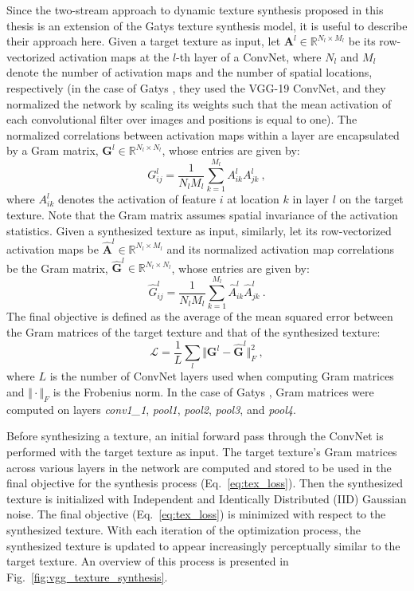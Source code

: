 Since the two-stream approach to dynamic texture synthesis proposed in this thesis is an extension of the Gatys \etal \cite{gatys2015} texture 
synthesis model, it is useful to describe their approach here. Given a target texture as input,
let $\mathbf{A}^{l} \in \mathbb{R}^{N_l\times M_l}$
be its row-vectorized activation maps at the $l$-th layer of a ConvNet, where $N_l$ and $M_l$ denote the number of
activation maps and the number of spatial locations,
respectively (in the case of Gatys \etal \cite{gatys2015}, they used the VGG-19 ConvNet, and they normalized the network by scaling its weights such that the mean activation of each convolutional filter over images and positions is equal to one).
The normalized correlations between activation maps
within a layer are encapsulated by a Gram matrix,
$\mathbf{G}^l \in \mathbb{R}^{N_l \times N_l}$, whose entries are given by:
\begin{equation}
	G_{ij}^l = \frac{1}{N_l M_l} \sum_{k=1}^{M_l} A_{ik}^l A_{jk}^l\ ,
\end{equation}
where $A_{ik}^l$ denotes the activation of feature $i$ at
location $k$ in layer $l$ on the target texture. Note that the Gram matrix assumes spatial invariance of the activation statistics.
Given a synthesized texture as input, similarly, let its row-vectorized activation maps
be $\hat{\mathbf{A}}^{l} \in \mathbb{R}^{N_l\times M_l}$ and its normalized
activation map correlations be the Gram matrix, $\hat{\mathbf{G}}^l \in \mathbb{R}^{N_l \times N_l}$, whose entries are given by:
\begin{equation}
	\hat{G}_{ij}^l = \frac{1}{N_l M_l} \sum_{k=1}^{M_l} \hat{A}_{ik}^l \hat{A}_{jk}^l\ .
\end{equation}
The final objective is defined as the average of the mean squared error between
the Gram matrices of the target texture and that of the synthesized texture:
\begin{equation}
   \mathcal{L} = \frac{1}{L} \sum_{l} \Vert \mathbf{G}^l - \hat{\mathbf{G}}^l \Vert^2_F\ ,
   \label{eq:tex_loss}
\end{equation}
where $L$ is the number of ConvNet layers used when computing Gram matrices
and $\Vert \cdot \Vert_F$ is the Frobenius norm. In the case of Gatys \etal \cite{gatys2015}, Gram matrices were computed on
layers \emph{conv1\_1}, \emph{pool1}, \emph{pool2}, \emph{pool3}, and \emph{pool4}.

Before synthesizing a texture, an initial forward pass through the ConvNet is
performed with the target texture as input. The target texture's Gram matrices
across various layers in the network are computed and stored to be used in the final objective for
the synthesis process (Eq.\ \ref{eq:tex_loss}). Then the synthesized texture is initialized with Independent and Identically Distributed (IID)
Gaussian noise. The final
objective (Eq.\ \ref{eq:tex_loss}) is minimized with respect to the synthesized texture. With each
iteration of the optimization process, the synthesized texture is updated to appear increasingly
perceptually similar to the target texture. An overview of this process is presented in Fig.\ \ref{fig:vgg_texture_synthesis}.
\clearpage

\clearpage

